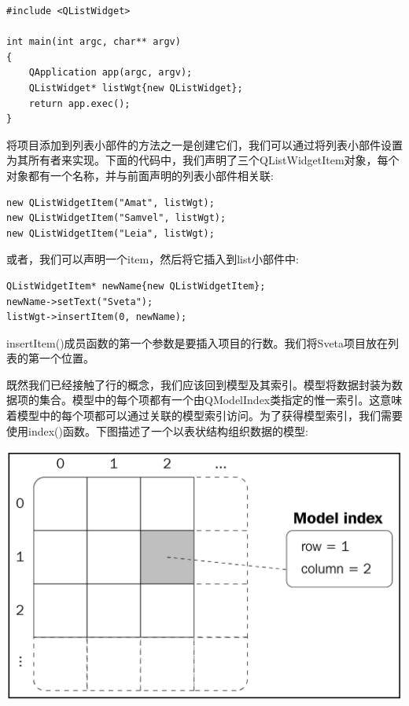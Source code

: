 \begin{lstlisting}[caption={}]
#include <QListWidget>

int main(int argc, char** argv)
{
	QApplication app(argc, argv);
	QListWidget* listWgt{new QListWidget};
	return app.exec();
}
\end{lstlisting}

将项目添加到列表小部件的方法之一是创建它们，我们可以通过将列表小部件设置为其所有者来实现。下面的代码中，我们声明了三个QListWidgetItem对象，每个对象都有一个名称，并与前面声明的列表小部件相关联: \par

\begin{lstlisting}[caption={}]
new QListWidgetItem("Amat", listWgt);
new QListWidgetItem("Samvel", listWgt);
new QListWidgetItem("Leia", listWgt);
\end{lstlisting}

或者，我们可以声明一个item，然后将它插入到list小部件中: \par

\begin{lstlisting}[caption={}]
QListWidgetItem* newName{new QListWidgetItem};
newName->setText("Sveta");
listWgt->insertItem(0, newName);
\end{lstlisting}

insertItem()成员函数的第一个参数是要插入项目的行数。我们将Sveta项目放在列表的第一个位置。 \par
既然我们已经接触了行的概念，我们应该回到模型及其索引。模型将数据封装为数据项的集合。模型中的每个项都有一个由QModelIndex类指定的惟一索引。这意味着模型中的每个项都可以通过关联的模型索引访问。为了获得模型索引，我们需要使用index()函数。下图描述了一个以表状结构组织数据的模型: \par

\begin{center}
	\includegraphics[width=1.0\textwidth]{content/Section-2/Chapter-14/10}
\end{center}

